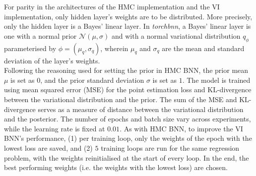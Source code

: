 \documentclass[conference]{IEEEtran}
\begin{document}
For parity in the architectures of the HMC implementation and the VI implementation, only hidden layer's weights are to be distributed. More precisely, only the hidden layer is a Bayes' linear layer. In \textit{torchbnn}, a Bayes' linear layer is one with a normal prior $\mathcal{N}(\mu, \sigma)$ and with a normal variational distribution $q_\phi$ parameterised by $\phi = (\mu_q, \sigma_q)$, wherein $\mu_q$ and $\sigma_q$ are the mean and standard deviation of the layer's weights.\\

Following the reasoning used for setting the prior in HMC BNN, the prior mean $\mu$ is set as $0$, and the prior standard deviation $\sigma$ is set as $1$. The model is trained using mean squared error (MSE) for the point estimation loss and KL-divergence between the variational distribution and the prior. The sum of the MSE and KL-divergence serves as a measure of distance between the variational distribution and the posterior. The number of epochs and batch size vary across experiments, while the learning rate is fixed at $0.01$. As with HMC BNN, to improve the VI BNN's performance, (1) per training loop, only the weights of the epoch with the lowest loss are saved, and (2) $5$ training loops are run for the same regression problem, with the weights reinitialised at the start of every loop. In the end, the best performing weights (i.e. the weights with the lowest loss) are chosen.
\end{document}
